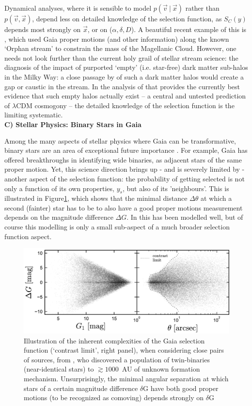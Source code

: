 Dynamical analyses, where it is sensible to model $p(\vec{v}~|~\vec{x})$ rather than $p(\vec{v},\vec{x})$, depend less on detailed knowledge of the selection function, as $S_C(y)$ depends most strongly on $\vec{x}$, or on ($\alpha,\delta,D$). A beautiful recent example of this is \citet{Erkal2019}, which used Gaia proper motions (and other information) along the known `Orphan stream' to constrain the mass of the Magellanic Cloud. 
However, one needs not look further than the current holy grail of stellar stream science: the diagnosis of the impact of purported `empty' (i.e. star-free) dark matter sub-halos in the Milky Way: a close passage by of such a dark matter halos would create a gap or caustic in the stream. In the analysis of \citet{Bonaca2019} that provides the currently best evidence that such empty halos actually exist -- a central and untested prediction of $\lambda$CDM cosmogony -- the detailed knowledge of the selection function is the limiting systematic. 
\\

\noindent\textbf{C) Stellar Physics: Binary Stars in Gaia}

Among the many aspects of stellar physics where Gaia can be transformative, binary stars are an area of exceptional future importance \citep[e.g.][]{Breivik2019}. For example, Gaia has offered breakthroughs in identifying wide binaries, as adjacent stars of the same proper motion. Yet, this science direction brings up - and is severely limited by - another aspect of the selection function: the probability of getting selected is not only a function of its own properties, $y_s$, but also of its 'neighbours'. This is illustrated in Figure\ref{fig:binaries}, which shows that the minimal distance $\Delta\theta$ at which a second (fainter) star has to be to also have a good proper motions measurement depends on the magnitude difference $\Delta G$. In \citet{ElBadry2019} this has been modelled well, but of course this modelling is only a small sub-aspect of a much broader selection function aspect.

\begin{figure}[ht!]
    \centering
    \includegraphics[width=0.5\linewidth]{img/BinarySelection_ElBadry.png}
    \caption{Illustration of the inherent complexities of the Gaia selection function (`contrast limit', right panel), when considering close pairs of sources, from \citet{ElBadry2019}, who discovered a population of twin-binaries (near-identical stars) to $\gtrsim 1000$~AU of unknown formation mechanism.
    Unsurprisingly, the minimal angular separation at which stars of a certain magnitude difference $\delta$G have both good proper motions (to be recognized as comoving) depends strongly on $\delta$G}
    \label{fig:binaries}
\end{figure}


